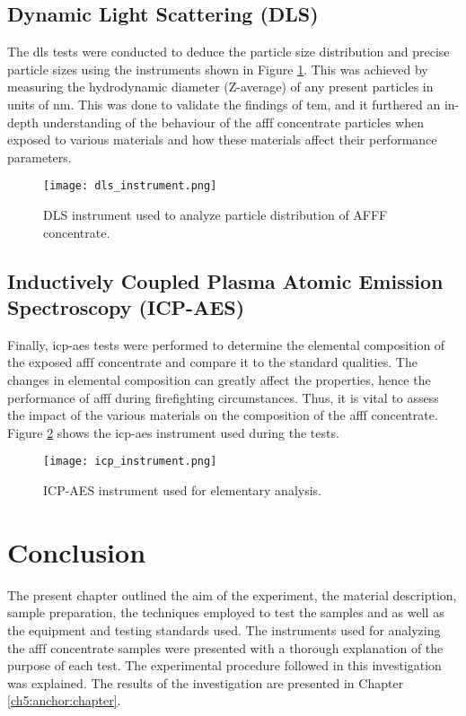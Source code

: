 \subsection{Dynamic Light Scattering (DLS)}
The \acrshort{dls} tests were conducted to deduce the particle size distribution and precise particle sizes using the instruments shown in Figure \ref{ch4:figure:dls}. This was achieved by measuring the hydrodynamic diameter (Z-average) of any present particles in units of nm. This was done to validate the findings of \acrshort{tem}, and it furthered an in-depth understanding of the behaviour of the \acrshort{afff} concentrate particles when exposed to various materials and how these materials affect their performance parameters.
 
\begin{figure}[H]
    \centering
    \texttt{[image: dls\_instrument.png]}
    \caption{DLS instrument used to analyze particle distribution of AFFF concentrate.}
    \label{ch4:figure:dls}
\end{figure}

\subsection{Inductively Coupled Plasma Atomic Emission Spectroscopy (ICP-AES)}
Finally, \acrshort{icp-aes} tests were performed to determine the elemental composition of the exposed \acrshort{afff} concentrate and compare it to the standard qualities. The changes in elemental composition can greatly affect the properties, hence the performance of \acrshort{afff} during firefighting circumstances. Thus, it is vital to assess the impact of the various materials on the composition of the \acrshort{afff} concentrate. Figure \ref{ch4:figure:icp-aes} shows the \acrshort{icp-aes} instrument used during the tests.
 
\begin{figure}[H]
    \centering
    \texttt{[image: icp\_instrument.png]}
    \caption{ICP-AES instrument used for elementary analysis.}
    \label{ch4:figure:icp-aes}
\end{figure}

\section{Conclusion}
The present chapter outlined the aim of the experiment, the material description, sample preparation, the techniques employed to test the samples and as well as the equipment and testing standards used. The instruments used for analyzing the \acrshort{afff} concentrate samples were presented with a thorough explanation of the purpose of each test. The experimental procedure followed in this investigation was explained. The results of the investigation are presented in Chapter \ref{ch5:anchor:chapter}.